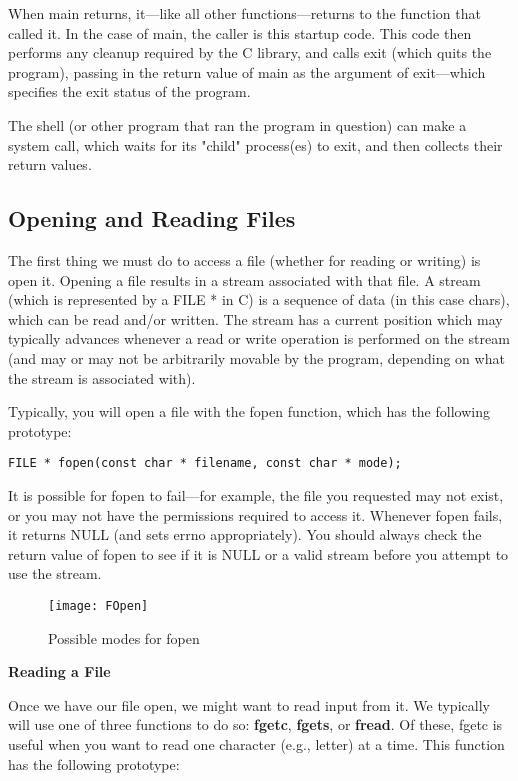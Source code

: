 \documentclass[11pt, a4paper]{article}
\begin{document}
When main returns, it—like all other functions—returns to the function that called it. In the case of main, the caller is this startup code. This code then performs any cleanup required by the C library, and calls exit (which quits the program), passing in the return value of main as the argument of exit—which specifies the exit status of the program.

The shell (or other program that ran the program in question) can make a system call, which waits for its "child" process(es) to exit, and then collects their return values.


\subsection{Opening and Reading Files}%
\label{sub:opening_and_reading_files}



The first thing we must do to access a file (whether for reading or writing) is open it. Opening a file results in a stream associated with that file. A stream (which is represented by a FILE * in C) is a sequence of data (in this case chars), which can be read and/or written. The stream has a current position which may typically advances whenever a read or write operation is performed on the stream (and may or may not be arbitrarily movable by the program, depending on what the stream is associated with).

Typically, you will open a file with the fopen function, which has the following prototype:


\texttt{FILE * fopen(const char * filename, const char * mode);} 


It is possible for fopen to fail—for example, the file you requested may not exist, or you may not have the permissions required to access it. Whenever fopen fails, it returns NULL (and sets errno appropriately). You should always check the return value of fopen to see if it is NULL or a valid stream before you attempt to use the stream.

\begin{figure}[htpb]
  \centering
  \texttt{[image: FOpen]}
  \caption{Possible modes for fopen}
  \label{fig:fopen}
\end{figure}

\textbf{Reading a File}

Once we have our file open, we might want to read input from it. We typically will use one of three functions to do so: \textbf{fgetc}, \textbf{fgets}, or \textbf{fread}. Of these, fgetc is useful when you want to read one character (e.g., letter) at a time. This function has the following prototype:
\end{document}
